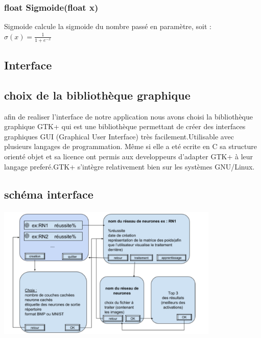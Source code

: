 \documentclass{article}
\begin{document}
		\subsubsection{\textcolor{myblue}{\textbf{float}} Sigmoide(\textcolor{myblue}{\textbf{float}} x)}
		Sigmoide calcule la sigmoide du nombre passé en paramètre, soit : \\
		$\sigma(x) = \frac{1}{1+e^{-x}}$
	\subsection{Interface}
		\subsection{choix de la bibliothèque graphique }
			afin de realiser l'interface de notre application nous avons choisi la bibliothèque graphique GTK+ qui est une bibliothèque permettant de créer des interfaces graphiques GUI (Graphical User Interface) très facilement.Utilisable avec plusieurs langages de programmation.
		Même si elle a eté ecrite en C sa structure orienté objet et sa licence ont permis aux developpeurs d'adapter GTK+ à leur langage preferé.GTK+ s'intègre relativement bien sur les systèmes GNU/Linux.
	\subsection{schéma interface}
				\begin{center} 
					\includegraphics[height=244, width=400]{croquis.PNG}
				\end{center}
\end{document}
